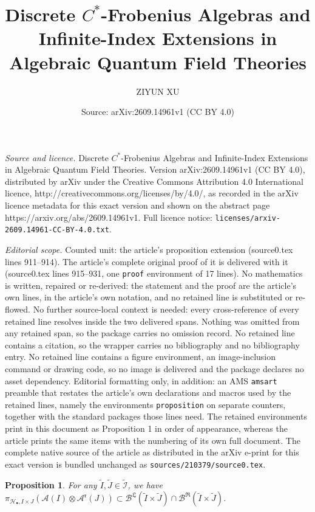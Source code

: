 \documentclass[10pt,a4paper]{amsart}
\title{\huge{Discrete $C^*$-Frobenius Algebras and Infinite-Index Extensions in Algebraic Quantum Field Theories}}
\author{{\sc ZIYUN XU}}
\date{Source: arXiv:2609.14961v1 (CC BY 4.0)}
\newtheorem{proposition}{Proposition}
\newcommand{\A}{\mathcal{A}}
\newcommand{\B}{\mathcal{B}}
\newcommand{\hilb}{\mathcal{H}}
\begin{document}
\maketitle

\noindent\emph{Source and licence.} \huge{Discrete $C^*$-Frobenius Algebras and Infinite-Index Extensions in Algebraic Quantum Field Theories}. Version arXiv:2609.14961v1 (CC BY 4.0), distributed by arXiv under the Creative Commons Attribution 4.0 International licence, http://creativecommons.org/licenses/by/4.0/, as recorded in the arXiv licence metadata for this exact version and shown on the abstract page https://arxiv.org/abs/2609.14961v1. Full licence notice: \texttt{licenses/arxiv-2609.14961-CC-BY-4.0.txt}.\par\smallskip

\noindent\textit{Editorial scope.} Counted unit: the article's proposition extension (source0.tex lines 911--914). The article's complete original proof of it is delivered with it (source0.tex lines 915--931, one \texttt{proof} environment of 17 lines). No mathematics is written, repaired or re-derived: the statement and the proof are the article's own lines, in the article's own notation, and no retained line is substituted or re-flowed.  No further source-local context is needed: every cross-reference of every retained line resolves inside the two delivered spans.  Nothing was omitted from any retained span, so the package carries no omission record.  No retained line contains a citation, so the wrapper carries no bibliography and no bibliography entry.  No retained line contains a figure environment, an image-inclusion command or drawing code, so no image is delivered and the package declares no asset dependency.  Editorial formatting only, in addition: an AMS \texttt{amsart} preamble that restates the article's own declarations and macros used by the retained lines, namely the environments \texttt{proposition} on separate counters, together with the standard packages those lines need.  The retained environments print in this document as Proposition 1 in order of appearance, whereas the article prints the same items with the numbering of its own full document.  The complete native source of the article as distributed in the arXiv e-print for this exact version is bundled unchanged as \texttt{sources/210379/source0.tex}.
\begin{proposition}\label{extension}
For any $\widetilde{I}, \widetilde{J} \in\widetilde{\mathcal{I}}$, we have 
    $ \pi_{\hilb_\bullet, I \times J}\left(\A(I)\otimes\A^\mathfrak{r}(J)\right) \subset  \B^{\mathfrak{L}}(\widetilde{I}\times\widetilde{J}) \cap \B^{\mathfrak{R}}(\widetilde{I}\times\widetilde{J})  $. 
\end{proposition}
\end{document}
